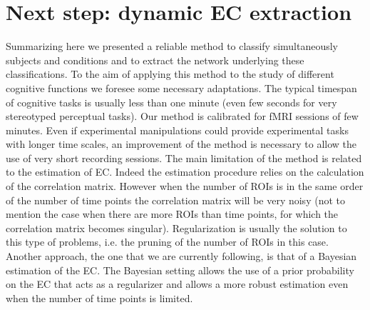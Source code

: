 \documentclass[12pt, a4paper, final, fleqn]{article}
\begin{document}
\section{Next step: dynamic EC extraction}
\label{dynEC}

Summarizing here we presented a reliable method to classify simultaneously subjects and conditions and to extract 
the network underlying these classifications.
To the aim of applying this method to the study of different cognitive functions we foresee some necessary adaptations.
The typical timespan of cognitive tasks is usually less than one minute (even few seconds for very stereotyped perceptual
tasks). Our method is calibrated for fMRI sessions of few minutes. Even if experimental manipulations could provide experimental
tasks with longer time scales, an improvement of the method is necessary to allow the use of very short recording sessions.
The main limitation of the method is related to the estimation of EC. Indeed the estimation procedure relies on the calculation of
the correlation matrix. However when the number of ROIs is in the same order of the number of time points the correlation matrix will be
very noisy (not to mention the case when there are more ROIs than time points, for which the correlation matrix becomes singular).
Regularization is usually the solution to this type of problems, i.e. the pruning of the number of ROIs in this case.
Another approach, the one that we are currently following, is that of a Bayesian estimation of the EC. The Bayesian setting allows the use of
a prior probability on the EC that acts as a regularizer and allows a more robust estimation even when the number of time points is limited.
\end{document}
